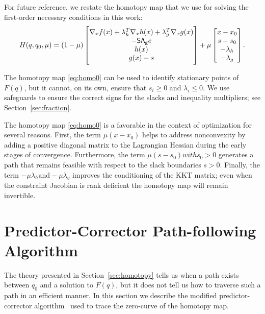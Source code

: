 For future reference, we restate the homotopy map that we use for solving the
first-order necessary conditions in this work:
\begin{equation}\label{eq:homo0}
    H(q, q_0, \mu) = (1-\mu)
    \begin{bmatrix}
      \nabla_x f(x) +   \lambda_h^T \nabla_x h(x)  +  \lambda_g^T \nabla_x g(x) \\
      -\mathsf{S}\mathsf{\Lambda_g} e \\
      h(x) \\
      g(x) - s 
    \end{bmatrix}
    + \mu
    \begin{bmatrix}
      x - x_0 \\
      s - s_0 \\
      -\lambda_h \\
      -\lambda_g
    \end{bmatrix}.
\end{equation}

\begin{remark}
  The homotopy map \eqref{eq:homo0} can be used to identify stationary points of
  $F(q)$, but it cannot, on its own, ensure that $s_i \geq 0$ and $\lambda_{i}
  \leq 0$.  We use safeguards to ensure the correct signs for the slacks and
  inequality multipliers; see Section~\ref{sec:fraction}.
\end{remark}

The homotopy map \eqref{eq:homo0} is a favorable in the context of optimization
for several reasons.  First, the term $\mu(x-x_0)$ helps to address nonconvexity
by adding a positive diagonal matrix to the Lagrangian Hessian during the early
stages of convergence.  Furthermore, the term $\mu(s - s_0) with s_0 > 0$ generates a path
that remains feasible with respect to the slack boundaries $s>0$.  Finally, the
term $-\mu\lambda_{h} \text{and}  -\mu\lambda_{g}$ improves the conditioning of the
KKT matrix; even when the constraint Jacobian is rank deficient the homotopy map
will remain invertible.

\section{Predictor-Corrector Path-following Algorithm}\label{sec:pc}
The theory presented in Section~\ref{sec:homotopy} tells us when a path exists
between $q_0$ and a solution to $F(q)$, but it does not tell us how to traverse
such a path in an efficient manner.  In this section we describe the modified
predictor-corrector algorithm~\cite{allgower_georg_1993} used to trace the
zero-curve of the homotopy map.

